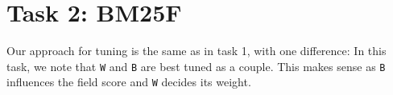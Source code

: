 \documentclass[10pt,twocolumn]{article}
\begin{document}
\section*{Task 2: BM25F}
Our approach for tuning is the same as in task 1, with one difference: In this task, we note that \texttt{W} and \texttt{B} are best tuned as a couple. This makes sense as \texttt{B} influences the field score and \texttt{W} decides its weight. 
\end{document}
